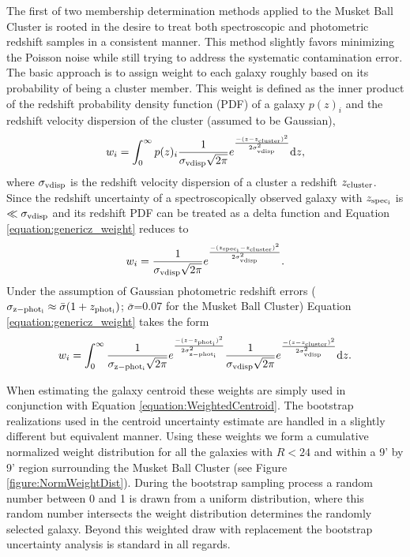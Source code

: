 The first of two membership determination methods applied to the Musket Ball Cluster is rooted in the desire to treat both spectroscopic and photometric redshift samples in a consistent manner. 
This method slightly favors minimizing the Poisson noise while still trying to address the systematic contamination error. 
The basic approach is to assign weight to each galaxy roughly based on its probability of being a cluster member.
This weight is defined as the inner product of the redshift probability density function (PDF) of a galaxy $p(z)_i$ and the redshift velocity dispersion of the cluster (assumed to be Gaussian),
\begin{equation}
w_i = \int_{0}^{\infty} p(z)_i \frac{1}{\sigma_{\rm vdisp}\sqrt{2\pi}}e^{\frac{-(z-z_{\rm cluster})^2}{2\sigma_{\rm vdisp}^2}}\mathrm{d}z,
\label{equation:genericz_weight}
\end{equation}
where $\sigma_{\rm vdisp}$ is the redshift velocity dispersion of a cluster a redshift $z_{\rm cluster}$.
Since the redshift uncertainty of a spectroscopically observed galaxy with $z_{\rm spec_{i}}$ is $\ll \sigma_{\rm vdisp}$ and its redshift PDF can be treated as a delta function and Equation \ref{equation:genericz_weight} reduces to
\begin{equation}
w_i = \frac{1}{\sigma_{\rm vdisp}\sqrt{2\pi}}e^{\frac{-(z_{\rm spec_{i}}-z_{\rm cluster})^2}{2\sigma_{\rm vdisp}^2}}.
\end{equation}\label{equation:specz_weight}
Under the assumption of Gaussian photometric redshift errors ($\sigma_{\rm z-phot_{i}} \approx \bar{\sigma}(1+z_{\rm phot_{i}})$; $\bar{\sigma}$=0.07 for the Musket Ball Cluster) Equation \ref{equation:genericz_weight} takes the form
\begin{equation}
w_i = \int_{0}^{\infty} \frac{1}{\sigma_{\rm z-phot_{i}}\sqrt{2\pi}}e^{\frac{-(z-z_{\rm phot_{i}})^2}{2\sigma_{\rm z-phot_{i}}^2}} \frac{1}{\sigma_{\rm vdisp}\sqrt{2\pi}}e^{\frac{-(z-z_{\rm cluster})^2}{2\sigma_{\rm vdisp}^2}}\mathrm{d}z.
\label{equation:photoz_weight}
\end{equation}

When estimating the galaxy centroid these weights are simply used in conjunction with Equation \ref{equation:WeightedCentroid}.
The bootstrap realizations used in the centroid uncertainty estimate are handled in a slightly different but equivalent manner.
Using these weights we form a cumulative normalized weight distribution for all the galaxies with $R<24$ and within a 9' by 9' region surrounding the Musket Ball Cluster (see Figure \ref{figure:NormWeightDist}).
During the bootstrap sampling process a random number between 0 and 1 is drawn from a uniform distribution, where this random number intersects the weight distribution determines the randomly selected galaxy.
Beyond this weighted draw with replacement the bootstrap uncertainty analysis is standard in all regards.

